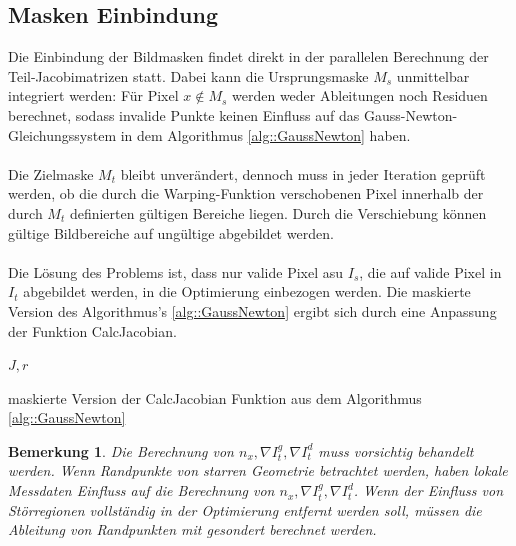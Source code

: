 \documentclass[12pt,DIV=15,BCOR=15mm,twoside,headsepline,abstract=true,listof=totoc,bibliography=totoc]{scrreprt}
\newtheorem{remark}{Bemerkung}[chapter]
\theoremstyle{remark}    %
\begin{document}
    \subsection{Masken Einbindung}
    Die Einbindung der Bildmasken findet direkt in der parallelen Berechnung der Teil-Jacobimatrizen statt. 
    Dabei kann die Ursprungsmaske $M_s$ unmittelbar integriert werden: Für Pixel $x \notin M_s$ werden weder Ableitungen noch Residuen berechnet, sodass invalide Punkte 
    keinen Einfluss auf das Gauss-Newton-Gleichungssystem in dem Algorithmus \ref{alg::GaussNewton} haben.\\\\
    Die Zielmaske $M_t$ bleibt unverändert, dennoch muss in jeder Iteration geprüft werden, ob die durch die Warping-Funktion verschobenen Pixel innerhalb der 
    durch $M_t$ definierten gültigen Bereiche liegen.
    Durch die Verschiebung können gültige Bildbereiche auf ungültige abgebildet werden.\\\\
    Die Lösung des Problems ist, dass nur valide Pixel asu $I_s$, die auf valide Pixel in $I_t$ abgebildet werden, in die Optimierung einbezogen werden. 
    Die maskierte Version des Algorithmus's \ref{alg::GaussNewton} ergibt sich durch eine Anpassung der Funktion \glqq CalcJacobian\grqq.
    \begin{algorithm}[h]
        \label{alg:maskoutJacob}
        
        \Return $J, r$\;
        \caption{maskierte Version der CalcJacobian Funktion aus dem Algorithmus \ref{alg::GaussNewton}}

    \end{algorithm}
    
    \begin{remark}
    Die Berechnung von $n_x,\nabla I_t^g, \nabla I_t^d$ muss vorsichtig behandelt werden. Wenn Randpunkte von starren Geometrie 
    betrachtet werden, haben lokale Messdaten Einfluss auf die Berechnung von $n_x,\nabla I_t^g, \nabla I_t^d$. Wenn der Einfluss von Störregionen
    vollständig in der Optimierung entfernt werden soll, müssen die Ableitung von Randpunkten mit gesondert berechnet werden.
    \end{remark}
\end{document}
